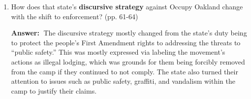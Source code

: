 \documentclass{article}
\newcommand{\answer}{\textbf{Answer:}$\;$}
\begin{document}
\begin{enumerate}[label=\arabic*)]
    \item How does that state's \textbf{discursive strategy} against Occupy Oakland change with the shift to enforcement? (pp. 61-64)
    
    \answer
    The discursive strategy mostly changed from the state's duty being to protect the people's First Amendment rights to addressing the threats to ``public safety.''
    This was mostly expressed via labeling the movement's actions as illegal lodging, which was grounds for them being forcibly removed from the camp if they continued to not comply.
    The state also turned their attention to issues such as public safety, graffiti, and vandalism within the camp to justify their claims.
    
\end{enumerate}
 
\end{document}
